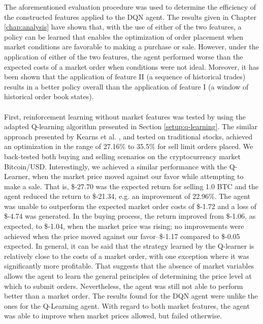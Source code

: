     The aforementioned evaluation procedure was used to determine the efficiency of the constructed features applied to the DQN agent.
    The results given in Chapter \ref{chap:analysis} have shown that, with the use of either of the two features, a policy can be learned that enables the  optimization of order placement when market conditions are favorable to making a purchase or sale.
    However, under the application of either of the two features, the agent performed worse than the expected costs of a market order when conditions were not ideal.
    Moreover, it has been shown that the application of feature II (a sequence of historical trades) results in a better policy overall than the application of feature I (a window of historical order book states).
    \\
    \\
    First, reinforcement learning without market features was tested by using the adapted Q-learning algorithm presented in Section \ref{setup:q-learning}.
    The similar approach presented by Kearns et al. \cite{nevmyvaka2006reinforcement}, and tested on traditional stocks, achieved an optimization in the range of 27.16\% to 35.5\% for sell limit orders placed.
    We back-tested both buying and selling scenarios on the cryptocurrency market Bitcoin/USD.
    Interestingly, we achieved a similar performance with the Q-Learner, when the market price moved against our favor while attempting to make a sale.
    That is, \$-27.70 was the expected return for selling 1.0 BTC and the agent reduced the return to \$-21.34, e.g. an improvement of 22.96\%.
    The agent was unable to outperform the expected market order costs of \$-1.72 and a loss of \$-4.74 was generated.
    In the buying process, the return improved from \$-1.06, as expected, to \$-1.04, when the market price was rising; no improvements were achieved when the price moved against our favor--\$-1.17 compared to \$-0.05 expected.
    In general, it can be said that the strategy learned by the Q-learner is relatively close to the costs of a market order, with one exception where it was significantly more profitable.
    That suggests that the absence of market variables allows the agent to learn the general principles of determining the price level at which to submit orders. Nevertheless, the agent was still not able to perform better than a market order.
    The results found for the DQN agent were unlike the ones for the Q-Learning agent. 
    With regard to both market features, the agent was able to improve when market prices allowed, but failed otherwise.
